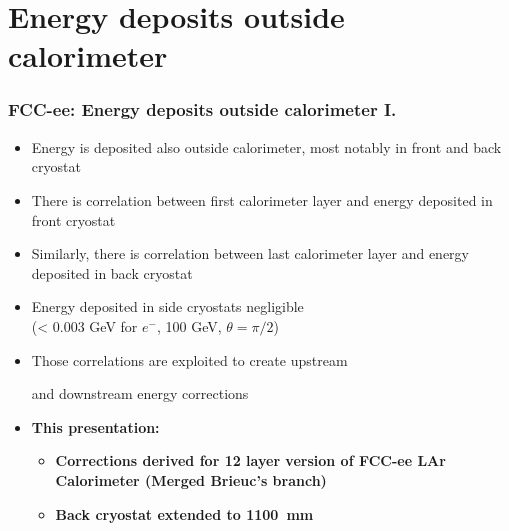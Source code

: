 \documentclass{beamer}
\newcommand{\bluetext}[1]{%
  \textcolor{myBlue}{#1}
}
\newcommand{\redtext}[1]{%
  \textcolor{myRed}{#1}
}
\begin{document}
\section{Energy deposits outside calorimeter}

\begin{frame}
  \frametitle{FCC-ee: Energy deposits outside calorimeter I.}

  \begin{itemize}
    \item Energy is deposited also outside calorimeter, most notably in front
          and back cryostat
    \item There is correlation between first calorimeter layer and energy
          deposited in front cryostat
    \item Similarly, there is correlation between last calorimeter layer and
          energy deposited in back cryostat
    \item Energy deposited in side cryostats negligible \\
          (< 0.003 GeV for $e^{-}$, 100 GeV, $\theta = \pi/2$)
    \item Those correlations are exploited to create \redtext{upstream}
          and \redtext{downstream} energy corrections
    \item \bluetext{\bf This presentation:}
          \begin{itemize}
            \item \bluetext{\bf Corrections derived for 12 layer version of FCC-ee LAr
              Calorimeter (Merged Brieuc's branch)}
            \item \bluetext{\bf Back cryostat extended to 1100~mm}
          \end{itemize}
  \end{itemize}
\end{frame}
\end{document}
